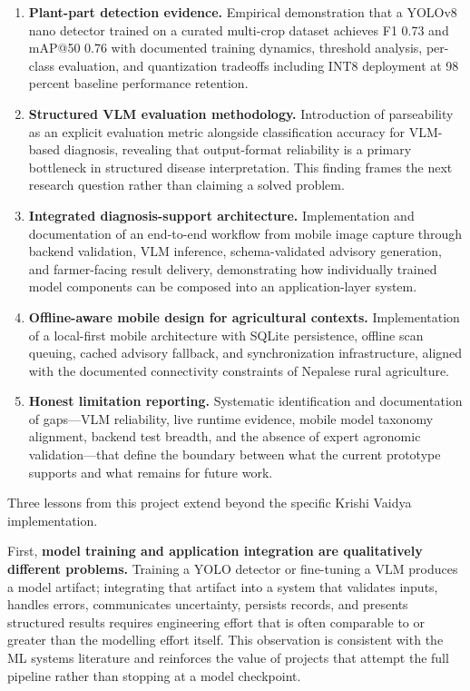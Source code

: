 \begin{enumerate}[label=\arabic*.]
\item \textbf{Plant-part detection evidence.} Empirical demonstration that a YOLOv8 nano
detector trained on a curated multi-crop dataset achieves F1 0.73 and mAP@50 0.76 with
documented training dynamics, threshold analysis, per-class evaluation, and quantization
tradeoffs including INT8 deployment at 98 percent baseline performance retention.

\item \textbf{Structured VLM evaluation methodology.} Introduction of parseability as an
explicit evaluation metric alongside classification accuracy for VLM-based diagnosis,
revealing that output-format reliability is a primary bottleneck in structured disease
interpretation. This finding frames the next research question rather than claiming a solved
problem.

\item \textbf{Integrated diagnosis-support architecture.} Implementation and documentation
of an end-to-end workflow from mobile image capture through backend validation, VLM inference,
schema-validated advisory generation, and farmer-facing result delivery, demonstrating how
individually trained model components can be composed into an application-layer system.

\item \textbf{Offline-aware mobile design for agricultural contexts.} Implementation of a
local-first mobile architecture with SQLite persistence, offline scan queuing, cached advisory
fallback, and synchronization infrastructure, aligned with the documented connectivity
constraints of Nepalese rural agriculture.

\item \textbf{Honest limitation reporting.} Systematic identification and documentation of
gaps---VLM reliability, live runtime evidence, mobile model taxonomy alignment, backend test
breadth, and the absence of expert agronomic validation---that define the boundary between what
the current prototype supports and what remains for future work.
\end{enumerate}


Three lessons from this project extend beyond the specific Krishi Vaidya implementation.

First, \textbf{model training and application integration are qualitatively different problems.}
Training a YOLO detector or fine-tuning a VLM produces a model artifact; integrating that
artifact into a system that validates inputs, handles errors, communicates uncertainty, persists
records, and presents structured results requires engineering effort that is often comparable to
or greater than the modelling effort itself. This observation is consistent with the ML systems
literature \parencite{sculleyMLTechDebt2015,paleyes2022MLSystemsChallenges} and reinforces the
value of projects that attempt the full pipeline rather than stopping at a model checkpoint.

